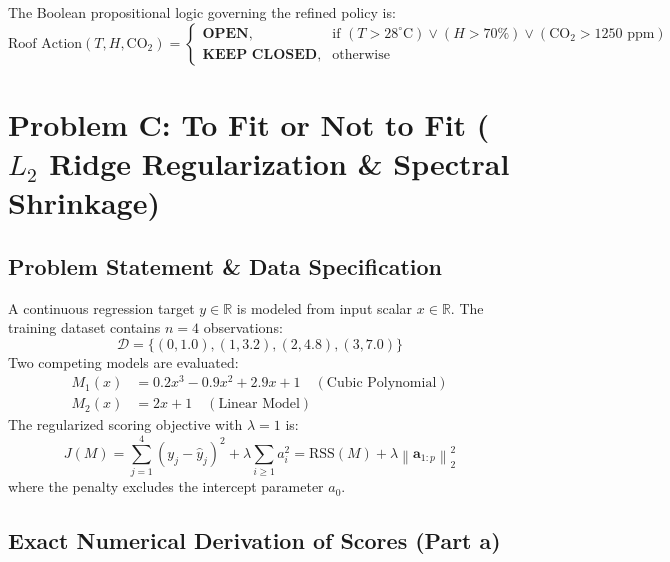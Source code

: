 \documentclass[11pt,a4paper]{article}
\theoremstyle{definition}
\theoremstyle{plain}
\theoremstyle{remark}
\newcommand{\norm}[1]{\left\lVert#1\right\rVert}
\newcommand{\R}{\mathbb{R}}
\begin{document}
The Boolean propositional logic governing the refined policy is:
\begin{equation}
\text{Roof Action}(T, H, \text{CO}_2) = \begin{cases}
\textbf{OPEN}, & \text{if } (T > 28^\circ\text{C}) \lor (H > 70\%) \lor (\text{CO}_2 > 1250\text{ ppm}) \\
\textbf{KEEP CLOSED}, & \text{otherwise}
\end{cases}
\end{equation}

\section{Problem C: To Fit or Not to Fit (\texorpdfstring{$L_2$}{L2} Ridge Regularization \& Spectral Shrinkage)}

\subsection{Problem Statement \& Data Specification}
A continuous regression target $y \in \R$ is modeled from input scalar $x \in \R$. The training dataset contains $n = 4$ observations:
\begin{equation}
\mathcal{D} = \{(0, 1.0), (1, 3.2), (2, 4.8), (3, 7.0)\}
\end{equation}
Two competing models are evaluated:
\begin{align}
M_1(x) &= 0.2x^3 - 0.9x^2 + 2.9x + 1 \quad (\text{Cubic Polynomial}) \\
M_2(x) &= 2x + 1 \quad (\text{Linear Model})
\end{align}
The regularized scoring objective with $\lambda = 1$ is:
\begin{equation}
J(M) = \sum_{j=1}^4 (y_j - \hat{y}_j)^2 + \lambda \sum_{i \ge 1} a_i^2 = \text{RSS}(M) + \lambda \norm{\mathbf{a}_{1:p}}_2^2
\label{eq:ridge_loss}
\end{equation}
where the penalty excludes the intercept parameter $a_0$.

\subsection{Exact Numerical Derivation of Scores (Part a)}
\end{document}
